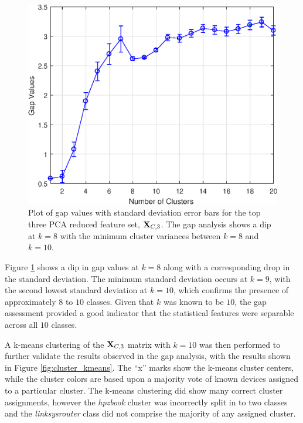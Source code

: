 \begin{figure}[tb]
	\includegraphics[width=\textwidth]{./dasp_algorithm_results/dasp_stat_cluster_gap.eps}
	\centering
	\caption{Plot of gap values with standard deviation error bars for the top three PCA reduced feature set, $\textit{\bf{X}}_{C,3}$.  The gap analysis shows a dip at $k=8$ with the minimum cluster variances between $k=8$ and $k=10$.}
	\label{fig:cluster_gap}
\end{figure}

Figure \ref{fig:cluster_gap} shows a dip in gap values at $k=8$ along with a corresponding drop in the standard deviation.  The minimum standard deviation occurs at $k=9$, with the second lowest standard deviation at $k=10$, which confirms the presence of approximately $8$ to $10$ classes.  Given that $k$ was known to be $10$, the gap assessment provided a good indicator that the statistical features were separable across all $10$ classes.  

A k-means clustering of the $\textit{\bf{X}}_{C,3}$ matrix with $k=10$ was then performed to further validate the results observed in the gap analysis, with the results shown in Figure \ref{fig:cluster_kmeans}.  The ``x'' marks show the k-means cluster centers, while the cluster colors are based upon a majority vote of known devices assigned to a particular cluster.  The k-means clustering did show many correct cluster assignments, however the \textit{hpzbook} cluster was incorrectly split in to two classes and the \textit{linksysrouter} class did not comprise the majority of any assigned cluster.

